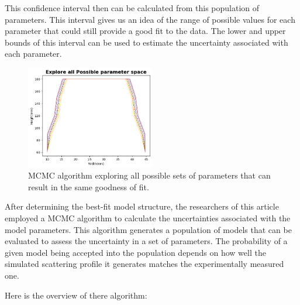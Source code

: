 \medskip

This confidence interval then can be calculated from this population of parameters. This interval gives us an idea of the range of possible values for each parameter that could still provide a good fit to the data.
The lower and upper bounds of this interval can be used to estimate the uncertainty associated with each parameter.

\begin{figure}[h]
    \centering
    \includegraphics[width=0.5\textwidth]{images/mcmc.png}
    \caption{MCMC algorithm exploring all possible sets of parameters that can result in the same goodness of fit.}
\end{figure}
\medskip

After determining the best-fit model structure, the researchers of this article \cite{sunday2016evaluation}
employed a MCMC algorithm to calculate the uncertainties associated with the model parameters.
This algorithm generates a population of models that can be evaluated to assess the uncertainty
in a set of parameters. The probability of a given model being accepted into the population
depends on how well the simulated scattering profile it generates matches the experimentally
measured one.

Here is the overview of there algorithm:

